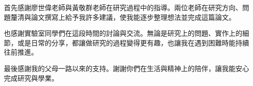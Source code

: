 
\begin{acknowledgement}

首先感謝廖世偉老師與黃敬群老師在研究過程中的指導。兩位老師在研究方向、問題釐清與論文撰寫上給予我許多建議，使我能逐步整理想法並完成這篇論文。

也感謝實驗室同學們在這段時間的討論與交流。無論是研究上的問題、實作上的細節，或是日常的分享，都讓做研究的過程變得更有趣，也讓我在遇到困難時能持續往前推進。

最後感謝我的父母一路以來的支持。謝謝你們在生活與精神上的陪伴，讓我能安心完成研究與學業。

\end{acknowledgement}
